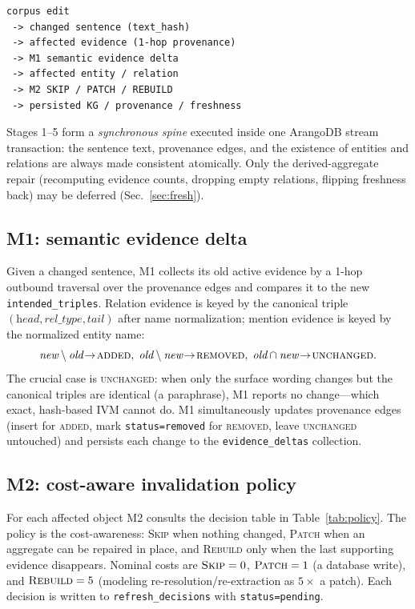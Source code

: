 \documentclass[conference]{IEEEtran}
\begin{document}
\begin{lstlisting}
corpus edit
 -> changed sentence (text_hash)
 -> affected evidence (1-hop provenance)
 -> M1 semantic evidence delta
 -> affected entity / relation
 -> M2 SKIP / PATCH / REBUILD
 -> persisted KG / provenance / freshness
\end{lstlisting}

Stages 1--5 form a \emph{synchronous spine} executed inside one ArangoDB stream
transaction: the sentence text, provenance edges, and the existence of entities
and relations are always made consistent atomically. Only the derived-aggregate
repair (recomputing evidence counts, dropping empty relations, flipping freshness
back) may be deferred (Sec.~\ref{sec:fresh}).

\subsection{M1: semantic evidence delta}
Given a changed sentence, M1 collects its old active evidence by a 1-hop outbound
traversal over the provenance edges and compares it to the new
\texttt{intended\_triples}. Relation evidence is keyed by the canonical triple
$(\textit{head}, \textit{rel\_type}, \textit{tail})$ after name normalization;
mention evidence is keyed by the normalized entity name:
\[
\textit{new}\setminus\textit{old}\!\rightarrow\!\textsc{added},\;
\textit{old}\setminus\textit{new}\!\rightarrow\!\textsc{removed},\;
\textit{old}\cap\textit{new}\!\rightarrow\!\textsc{unchanged}.
\]
The crucial case is \textsc{unchanged}: when only the surface wording changes but
the canonical triples are identical (a paraphrase), M1 reports no change---which
exact, hash-based IVM cannot do. M1 simultaneously updates provenance edges
(insert for \textsc{added}, mark \texttt{status=removed} for \textsc{removed},
leave \textsc{unchanged} untouched) and persists each change to the
\texttt{evidence\_deltas} collection.

\subsection{M2: cost-aware invalidation policy}
For each affected object M2 consults the decision table in
Table~\ref{tab:policy}. The policy is the cost-awareness: \textsc{Skip} when
nothing changed, \textsc{Patch} when an aggregate can be repaired in place, and
\textsc{Rebuild} only when the last supporting evidence disappears. Nominal costs
are $\textsc{Skip}=0$, $\textsc{Patch}=1$ (a database write), and
$\textsc{Rebuild}=5$ (modeling re-resolution/re-extraction as $5\times$ a patch).
Each decision is written to \texttt{refresh\_decisions} with
\texttt{status=pending}.
\end{document}
